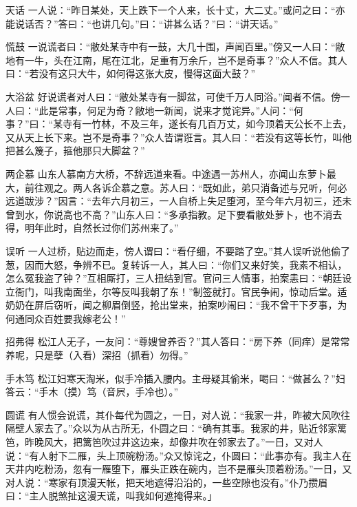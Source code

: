 \documentclass[12pt,UTF8]{ctexbook}
\begin{document}
天话
一人说：“昨日某处，天上跌下一个人来，长十丈，大二丈。”或问之曰：“亦能说话否？”答曰：“也讲几句。”曰：“讲甚么话？”曰：“讲天话。”

慌鼓
一说谎者曰：“敝处某寺中有一鼓，大几十围，声闻百里。”傍又一人曰：“敝地有一牛，头在江南，尾在江北，足重有万余斤，岂不是奇事？”众人不信。其人曰：“若没有这只大牛，如何得这张大皮，慢得这面大鼓？”

大浴盆
好说谎者对人曰：“敝处某寺有一脚盆，可使千万人同浴。”闻者不信。傍一人曰：“此是常事，何足为奇？敝地一新闻，说来才觉诧异。”人问：“何事？”曰：“某寺有一竹林，不及三年，遂长有几百万丈，如今顶着天公长不上去，又从天上长下来。岂不是奇事？”众人皆谓诳言。其人曰：“若没有这等长竹，叫他把甚么篾子，箍他那只大脚盆？”

两企慕
山东人慕南方大桥，不辞远道来看。中途遇一苏州人，亦闻山东萝卜最大，前往观之。两人各诉企慕之意。苏人曰：“既如此，弟只消备述与兄听，何必远道跋涉？”因言：“去年六月初三，一人自桥上失足堕河，至今年六月初三，还未曾到水，你说高也不高？”山东人曰：“多承指教。足下要看敝处萝卜，也不消去得，明年此时，自然长过你们苏州来了。”

误听
一人过桥，贴边而走，傍人谓曰：“看仔细，不要踏了空。”其人误听说他偷了葱，因而大怒，争辨不已。复转诉一人，其人曰：“你们又来好笑，我素不相认，怎么冤我盗了钟？”互相厮打，三人扭结到官。官问三人情事，拍案恚曰：“朝廷设立衙门，叫我南面坐，尔等反叫我朝了东！”制签就打。官民争闹，惊动后堂。适奶奶在屏后窃听，闻之柳眉倒竖，抢出堂来，拍案吵闹曰：“我不曾干下歹事，为何通同众百姓要我嫁老公！”

招弗得
松江人无子，一友问：“尊嫂曾养否？”其人答曰：“房下养（同痒）是常常养呢，只是孽（入看）深招（抓看）勿得。”

手木笃
松江妇寒天淘米，似手冷插入腰内。主母疑其偷米，喝曰：“做甚么？”妇答云：“手木（摸）笃（音屄，手冷也）。”

圆谎
有人惯会说谎，其仆每代为圆之，一日，对人说：“我家一井，昨被大风吹往隔壁人家去了。”众以为从古所无，仆圆之曰：“确有其事。我家的井，贴近邻家篱笆，昨晚风大，把篱笆吹过井这边来，却像井吹在邻家去了。”一日，又对人说：“有人射下二雁，头上顶碗粉汤。”众又惊诧之，仆圆曰：“此事亦有。我主人在天井内吃粉汤，忽有一雁堕下，雁头正跌在碗内，岂不是雁头顶着粉汤。”一日，又对人说：“寒家有顶漫天帐，把天地遮得沿沿的，一些空隙也没有。”仆乃攒眉曰：“主人脱煞扯这漫天谎，叫我如何遮掩得来。」
\end{document}
